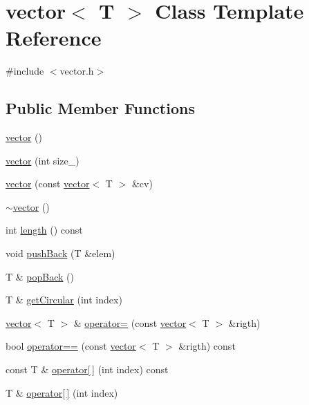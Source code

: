 \hypertarget{classvector}{\section{vector$<$ T $>$ Class Template Reference}
\label{classvector}
}


{\ttfamily \#include $<$vector.\-h$>$}

\subsection*{Public Member Functions}
\begin{DoxyCompactItemize}
\item 
\hyperlink{classvector_a00d237f22fd5eb1aa9a536993e82e54f}{vector} ()
\item 
\hyperlink{classvector_ae47a954b372e645e4e0c7b973f7c33b2}{vector} (int size\-\_\-)
\item 
\hyperlink{classvector_a55a9bd885df4e719eddded0f8c018b28}{vector} (const \hyperlink{classvector}{vector}$<$ T $>$ \&cv)
\item 
\hyperlink{classvector_a7bc236f547bb5debe890fa8ebaabe965}{$\sim$vector} ()
\item 
int \hyperlink{classvector_a77f8876b58fdb369a0a9576dc2215031}{length} () const 
\item 
void \hyperlink{classvector_ae7f0ac8afa4d67de3a841c66320df01b}{push\-Back} (T \&elem)
\item 
T \& \hyperlink{classvector_a7330b653a0bfc5abed10d87b924917b9}{pop\-Back} ()
\item 
T \& \hyperlink{classvector_abea62f5cb562223e8ce71042467a7f36}{get\-Circular} (int index)
\item 
\hyperlink{classvector}{vector}$<$ T $>$ \& \hyperlink{classvector_a5011f7a433f354e3710f96134cc7f56c}{operator=} (const \hyperlink{classvector}{vector}$<$ T $>$ \&rigth)
\item 
bool \hyperlink{classvector_abf88bed106f292d3fb591f14650fd561}{operator==} (const \hyperlink{classvector}{vector}$<$ T $>$ \&rigth) const 
\item 
const T \& \hyperlink{classvector_aa6ee18d204051b0dc6acdd043efbee78}{operator\mbox{[}$\,$\mbox{]}} (int index) const 
\item 
T \& \hyperlink{classvector_afd7cc79111970bb2efe406b7040bc63a}{operator\mbox{[}$\,$\mbox{]}} (int index)
\end{DoxyCompactItemize}
